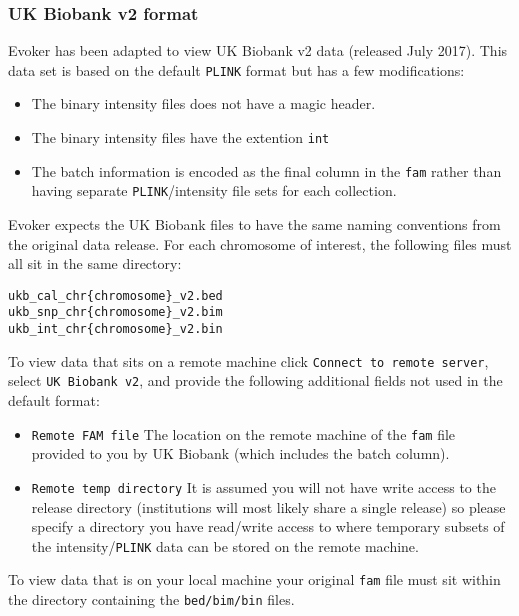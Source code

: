 \documentclass{article}
\begin{document}
\subsubsection{UK Biobank v2 format}

Evoker has been adapted to view UK Biobank v2 data (released July 2017). This data set is based on the default \texttt{PLINK} format but has a few modifications:

\begin{itemize}
\item{The binary intensity files does not have a magic header.}
\item{The binary intensity files have the extention \texttt{int}}
\item{The batch information is encoded as the final column in the \texttt{fam} rather than having separate \texttt{PLINK}/intensity file sets for each collection.}
\end{itemize}

Evoker expects the UK Biobank files to have the same naming conventions from the original data release. For each chromosome of interest, the following files must all sit in the same directory:

\begin{verbatim}
ukb_cal_chr{chromosome}_v2.bed
ukb_snp_chr{chromosome}_v2.bim
ukb_int_chr{chromosome}_v2.bin
\end{verbatim}

To view data that sits on a remote machine click \texttt{Connect to remote server}, select \texttt{UK Biobank v2}, and provide the following additional fields not used in the default format:

\begin{itemize}
\item{\texttt{Remote FAM file} The location on the remote machine of the \texttt{fam} file provided to you by UK Biobank (which includes the batch column).}
\item{\texttt{Remote temp directory} It is assumed you will not have write access to the release directory (institutions will most likely share a single release) so please specify a directory you have read/write access to where temporary subsets of the intensity/\texttt{PLINK} data can be stored on the remote machine.}
\end{itemize}

To view data that is on your local machine your original \texttt{fam} file must sit within the directory containing the \texttt{bed/bim/bin} files.
\end{document}
